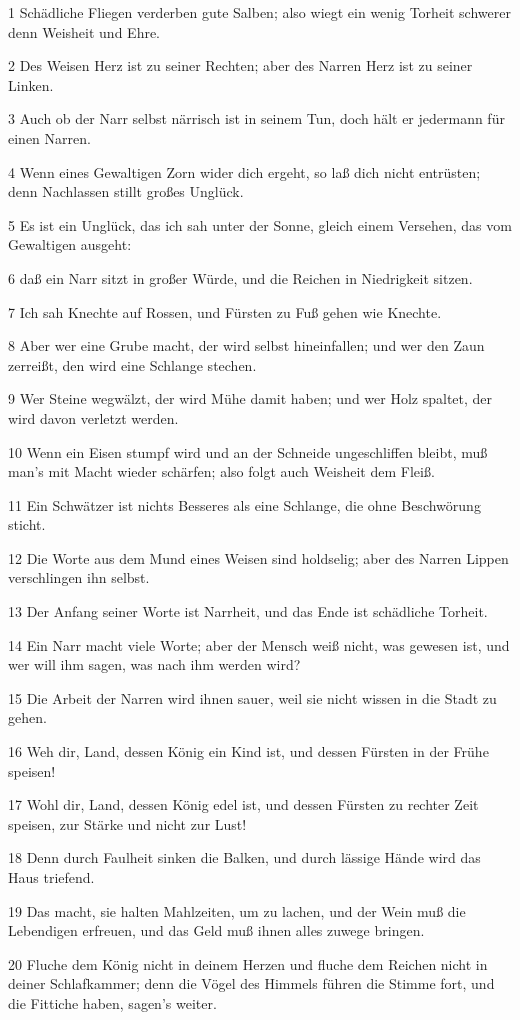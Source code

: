 \par 1 Schädliche Fliegen verderben gute Salben; also wiegt ein wenig Torheit schwerer denn Weisheit und Ehre.
\par 2 Des Weisen Herz ist zu seiner Rechten; aber des Narren Herz ist zu seiner Linken.
\par 3 Auch ob der Narr selbst närrisch ist in seinem Tun, doch hält er jedermann für einen Narren.
\par 4 Wenn eines Gewaltigen Zorn wider dich ergeht, so laß dich nicht entrüsten; denn Nachlassen stillt großes Unglück.
\par 5 Es ist ein Unglück, das ich sah unter der Sonne, gleich einem Versehen, das vom Gewaltigen ausgeht:
\par 6 daß ein Narr sitzt in großer Würde, und die Reichen in Niedrigkeit sitzen.
\par 7 Ich sah Knechte auf Rossen, und Fürsten zu Fuß gehen wie Knechte.
\par 8 Aber wer eine Grube macht, der wird selbst hineinfallen; und wer den Zaun zerreißt, den wird eine Schlange stechen.
\par 9 Wer Steine wegwälzt, der wird Mühe damit haben; und wer Holz spaltet, der wird davon verletzt werden.
\par 10 Wenn ein Eisen stumpf wird und an der Schneide ungeschliffen bleibt, muß man's mit Macht wieder schärfen; also folgt auch Weisheit dem Fleiß.
\par 11 Ein Schwätzer ist nichts Besseres als eine Schlange, die ohne Beschwörung sticht.
\par 12 Die Worte aus dem Mund eines Weisen sind holdselig; aber des Narren Lippen verschlingen ihn selbst.
\par 13 Der Anfang seiner Worte ist Narrheit, und das Ende ist schädliche Torheit.
\par 14 Ein Narr macht viele Worte; aber der Mensch weiß nicht, was gewesen ist, und wer will ihm sagen, was nach ihm werden wird?
\par 15 Die Arbeit der Narren wird ihnen sauer, weil sie nicht wissen in die Stadt zu gehen.
\par 16 Weh dir, Land, dessen König ein Kind ist, und dessen Fürsten in der Frühe speisen!
\par 17 Wohl dir, Land, dessen König edel ist, und dessen Fürsten zu rechter Zeit speisen, zur Stärke und nicht zur Lust!
\par 18 Denn durch Faulheit sinken die Balken, und durch lässige Hände wird das Haus triefend.
\par 19 Das macht, sie halten Mahlzeiten, um zu lachen, und der Wein muß die Lebendigen erfreuen, und das Geld muß ihnen alles zuwege bringen.
\par 20 Fluche dem König nicht in deinem Herzen und fluche dem Reichen nicht in deiner Schlafkammer; denn die Vögel des Himmels führen die Stimme fort, und die Fittiche haben, sagen's weiter.

